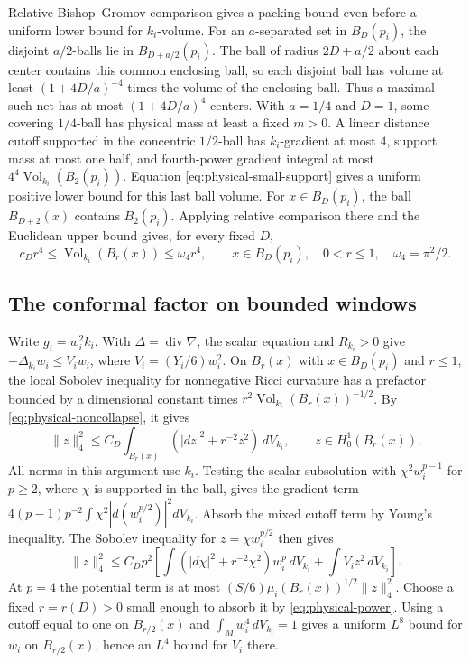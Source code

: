 Relative Bishop--Gromov comparison gives a packing bound even before
a uniform lower bound for \(k_i\)-volume. For an \(a\)-separated set
in \(B_D(p_i)\), the disjoint \(a/2\)-balls lie in \(B_{D+a/2}(p_i)\).
The ball of radius \(2D+a/2\) about each center contains this common
enclosing ball, so each disjoint ball has volume at least
\((1+4D/a)^{-4}\) times the volume of the enclosing ball. Thus a
maximal such net has at most \((1+4D/a)^4\) centers. With \(a=1/4\)
and \(D=1\), some covering \(1/4\)-ball has physical mass at least a
fixed \(m>0\). A linear distance cutoff supported in the concentric
\(1/2\)-ball has \(k_i\)-gradient at most \(4\), support mass at most
one half, and fourth-power gradient integral at most
\(4^4\operatorname{Vol}_{k_i}(B_2(p_i))\). Equation
\eqref{eq:physical-small-support} gives a uniform positive lower
bound for this last ball volume. For \(x\in B_D(p_i)\), the ball
\(B_{D+2}(x)\) contains \(B_2(p_i)\). Applying relative comparison
there and the Euclidean upper bound gives, for every fixed \(D\),
\begin{equation}\label{eq:physical-noncollapse}
 c_D r^4\leq \operatorname{Vol}_{k_i}(B_r(x))\leq\omega_4r^4,
 \qquad x\in B_D(p_i),\quad 0<r\leq1,\quad \omega_4=\pi^2/2.
\end{equation}

\subsection{The conformal factor on bounded windows}

Write \(g_i=w_i^2k_i\). With \(\Delta=\operatorname{div}\nabla\),
the scalar equation and \(R_{k_i}>0\) give
\(-\Delta_{k_i}w_i\leq V_iw_i\), where \(V_i=(Y_i/6)w_i^2\).
On \(B_r(x)\) with \(x\in B_D(p_i)\) and \(r\leq1\), the
local Sobolev inequality for nonnegative Ricci curvature
\cite[Theorem~3.1]{SaloffCoste1992Uniformly} has a prefactor
bounded by a dimensional constant times
\(r^2\operatorname{Vol}_{k_i}(B_r(x))^{-1/2}\). By
\eqref{eq:physical-noncollapse}, it gives
\[
 \|z\|_4^2\leq C_D\int_{B_r(x)} (|dz|^2+r^{-2}z^2)\,dV_{k_i},
 \qquad z\in H^1_0(B_r(x)).
\]
All norms in this argument use \(k_i\). Testing the scalar
subsolution with \(\chi^2w_i^{p-1}\) for \(p\geq2\), where
\(\chi\) is supported in the ball, gives the gradient term
\(4(p-1)p^{-2}\int\chi^2|d(w_i^{p/2})|^2dV_{k_i}\). Absorb the
mixed cutoff term by Young's inequality. The Sobolev inequality for
\(z=\chi w_i^{p/2}\) then gives
\begin{equation}\label{eq:physical-moser}
 \|z\|_4^2\leq C_Dp^2\left[
 \int(|d\chi|^2+r^{-2}\chi^2)w_i^p\,dV_{k_i}
 +\int V_i z^2\,dV_{k_i}\right].
\end{equation}
At \(p=4\) the potential term is at most
\((S/6)\mu_i(B_r(x))^{1/2}\|z\|_4^2\). Choose a fixed
\(r=r(D)>0\) small enough to absorb it by \eqref{eq:physical-power}.
Using a cutoff equal to one on \(B_{r/2}(x)\) and
\(\int_M w_i^4\,dV_{k_i}=1\) gives a uniform \(L^8\) bound for
\(w_i\) on \(B_{r/2}(x)\), hence an \(L^4\) bound for \(V_i\) there.

